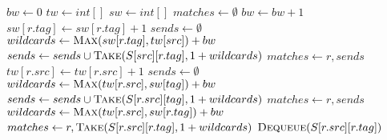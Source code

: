 \documentclass[preprint]{sigplanconf}
\begin{document}
\begin{algorithm*}
\begin{algorithmic}
	\State $bw \gets 0$
	\State $tw \gets int[]$
	\State $sw \gets int[]$
	\State $ matches \gets \emptyset $
			\State $ bw \gets bw+1 $
			\State $ sw[r.tag] \gets sw[r.tag]+1 $
			\State $ sends \gets \emptyset $
				\State $ wildcards \gets \Call{Max}{sw[r.tag], tw[src]} + bw $
				\State $ sends \gets sends \cup \Call{Take}{S[src][r.tag], 1 + wildcards }$
			\EndFor
			\State $ matches \gets r, sends $
			\State $ tw[r.src] \gets tw[r.src]+1 $
			\State $ sends \gets \emptyset $
				\State $ wildcards \gets \Call{Max}{tw[r.src], sw[tag]} + bw $
				\State $ sends \gets sends \cup \Call{Take}{S[r.src][tag], 1 + wildcards }$
			\EndFor
			\State $ matches \gets r, sends $
		\Else
			\State $ wildcards \gets \Call{Max}{tw[r.src], sw[r.tag]} + bw $
			\State $ matches \gets r, \Call{Take}{S[r.src][r.tag], 1 + wildcards } $
			\State $ \Call{Dequeue}{S[r.src][r.tag]} $
		\EndIf
	\EndFor
\EndFunction
\end{algorithmic}
\end{algorithm*}






% 



\end{document}
